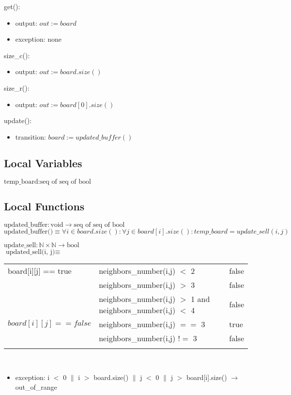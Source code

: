 \documentclass[12pt]{article}
\begin{document}
\noindent get():
\begin{itemize}
\item output: $out := board$
\item exception: none
\end{itemize}

\noindent size\_c():
\begin{itemize}
\item output:  $out := board.size()$

\end{itemize}

\noindent size\_r():
\begin{itemize}
\item output: $out := board[0].size()$

\end{itemize}

\noindent update():
\begin{itemize}
\item transition: $board := updated\_buffer()$
\end{itemize}

\subsection*{Local Variables}

\noindent $\text{temp\_board} : \text{seq of seq of bool}$

\subsection*{Local Functions}

\noindent $\text{updated\_buffer} : \text{void} \rightarrow \text{seq of seq of bool}$\\
\noindent $\text{updated\_buffer()} \equiv \forall i \in board.size() : \forall j \in board[i].size() : temp\_board = update\_sell(i ,j)$

\noindent $\text{update\_sell} : \mathbb{N} \times \mathbb{N} \rightarrow \text{bool}$\\
\noindent $\text{updated\_sell(i, j)} \equiv $

\begin{tabular}{|p{4cm}|p{7cm}|l|}
\hhline{|-|-|-|}
   board[i][j] == true & neighbors\_number(i,j) $<$ 2 & false\\
\hhline{|~|-|-|}
 & neighbors\_number(i,j) $>$ 3 & false\\
\hhline{|~|-|-|}
 & neighbors\_number(i,j) $>$ 1 and neighbors\_number(i,j) $<$ 4 & false\\
\hhline{|-|-|-|}
  $board[i][j] == false$ & neighbors\_number(i,j) $==$ 3 & true\\
\hhline{|~|-|-|}
 & neighbors\_number(i,j) $!=$ 3 & false\\
\hhline{|-|-|-|}
\end{tabular}\\
\begin{itemize}
\item exception: i $<$ 0 $\|$ i $>$ board.size() $\|$ j $<$ 0 $\|$ j $>$ board[i].size() $\rightarrow$ out\_of\_range
\end{itemize}
\end{document}
